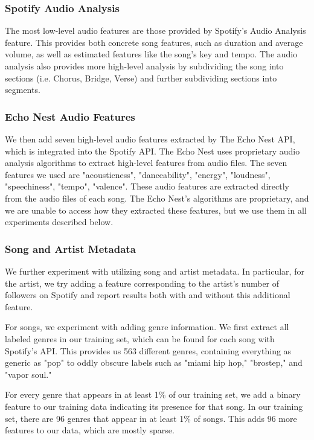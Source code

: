 \documentclass[journal]{IEEEtran}
\begin{document}
\subsubsection{Spotify Audio Analysis}
The most low-level audio features are those provided by Spotify's Audio Analysis feature. This provides both concrete song features, such as duration and average volume, as well as estimated features like the song's key and tempo. The audio analysis also provides more high-level analysis by subdividing the song into sections (i.e. Chorus, Bridge, Verse) and further subdividing sections into segments. \\

\subsubsection{Echo Nest Audio Features}
We then add seven high-level audio features extracted by The Echo Nest API, which is integrated into the Spotify API. The Echo Nest uses proprietary audio analysis algorithms to extract high-level features from audio files. The seven features we used are "acousticness", "danceability", "energy", "loudness", "speechiness", "tempo", "valence". These audio features are extracted directly from the audio files of each song. The Echo Nest's algorithms are proprietary, and we are unable to access how they extracted these features, but we use them in all experiments described below. \\

\subsubsection{Song and Artist Metadata}
We further experiment with utilizing song and artist metadata. In particular, for the artist, we try adding a feature corresponding to the artist's number of followers on Spotify and report results both with and without this additional feature.

For songs, we experiment with adding genre information. We first extract all labeled genres in our training set, which can be found for each song with Spotify's API. This provides us 563 different genres, containing everything as generic as "pop" to oddly obscure labels such as "miami hip hop," "brostep," and "vapor soul."

For every genre that appears in at least 1\% of our training set, we add a binary feature to our training data indicating its presence for that song. In our training set, there are 96 genres that appear in at least 1\% of songs. This adds 96 more features to our data, which are mostly sparse.
\end{document}
